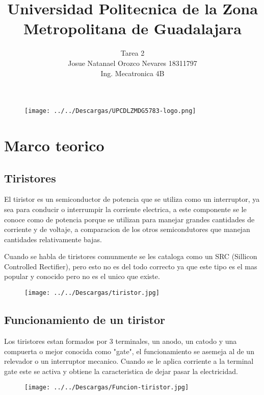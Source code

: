 \documentclass[12pt,a4paper]{article}
\begin{document}
\title{Universidad Politecnica de la Zona Metropolitana de Guadalajara}
\author{Tarea 2 \\ Josue Natanael Orozco Nevares 18311797 \\ Ing. Mecatronica 4B}
\maketitle

\begin{figure}[h!]
\centering
\texttt{[image: ../../Descargas/UPCDLZMDG5783-logo.png]} 
\end{figure}

\newpage

\section{Marco teorico}
\subsection{Tiristores}
El tiristor es un semiconductor de potencia que se utiliza como un interruptor, ya sea para conducir o interrumpir la corriente electrica, a este componente se le conoce como de potencia porque se utilizan para manejar grandes cantidades de corriente y de voltaje, a comparacion de los otros semicondutores que manejan cantidades relativamente bajas.

Cuando se habla de tiristores comunmente se les cataloga como un SRC (Sillicon Controlled Rectifier), pero esto no es del todo correcto ya que este tipo es el mas popular y conocido pero no es el unico que existe.

\begin{figure}[h!]
\centering
\texttt{[image: ../../Descargas/tiristor.jpg]} 
\end{figure}

\subsection{Funcionamiento de un tiristor}
Los tiristores estan formados por 3 terminales, un anodo, un catodo y una compuerta o mejor conocida como "gate", el funcionamiento se asemeja al de un relevador o un interruptor mecanico. Cuando se le aplica corriente a la terminal gate este se activa y obtiene la caracteristica de dejar pasar la electricidad.

\begin{figure}[h!]
\centering
\texttt{[image: ../../Descargas/Funcion-tiristor.jpg]} 
\end{figure}
\newpage
\end{document}
